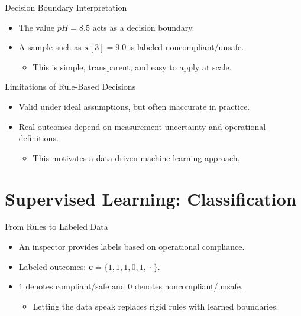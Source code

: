 \documentclass[10pt]{beamer}
\begin{document}
\begin{frame}{Decision Boundary Interpretation}
    \justifying
    \begin{itemize}
        \item The value $pH = 8.5$ acts as a decision boundary.
        \item A sample such as $\bm{x}[3] = 9.0$ is labeled noncompliant/unsafe.
        \begin{itemize}
            \item This is simple, transparent, and easy to apply at scale.
        \end{itemize}
    \end{itemize}
\end{frame}

\begin{frame}{Limitations of Rule-Based Decisions}
    \justifying
    \begin{itemize}
        \item Valid under ideal assumptions, but often inaccurate in practice.
        \item Real outcomes depend on measurement uncertainty and operational definitions.
        \begin{itemize}
            \item This motivates a data-driven machine learning approach.
        \end{itemize}
    \end{itemize}
\end{frame}

\section{Supervised Learning: Classification}

\begin{frame}{From Rules to Labeled Data}
    \justifying
    \begin{itemize}
        \item An inspector provides labels based on operational compliance.
        \item Labeled outcomes: $\bm{c} = \{1, 1, 1, 0, 1, \cdots\}$.
        \item $1$ denotes compliant/safe and $0$ denotes noncompliant/unsafe.
        \begin{itemize}
            \item Letting the data speak replaces rigid rules with learned boundaries.
        \end{itemize}
    \end{itemize}
\end{frame}
\end{document}
